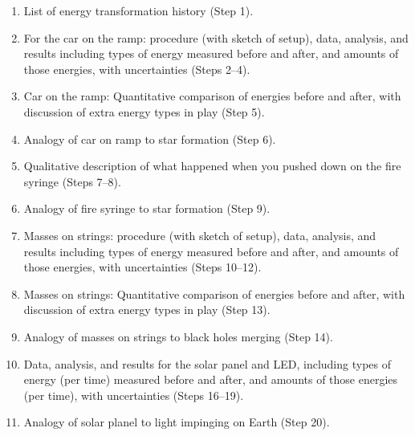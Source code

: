 \begin{enumerate}
	\item List of energy transformation history (Step 1).
	
	\item For the car on the ramp: procedure (with sketch of setup), data, analysis, and results including types of energy measured before and after, and amounts of those energies, with uncertainties (Steps 2--4).
	
	\item Car on the ramp: Quantitative comparison of energies before and after, with discussion of extra energy types in play (Step 5).
	
	\item Analogy of car on ramp to star formation (Step 6).
	
	\item Qualitative description of what happened when you pushed down on the fire syringe (Steps 7--8).
	
	\item Analogy of fire syringe to star formation (Step 9).
	
	\item Masses on strings: procedure (with sketch of setup), data, analysis, and results including types of energy measured before and after, and amounts of those energies, with uncertainties (Steps 10--12).
	
	\item Masses on strings: Quantitative comparison of energies before and after, with discussion of extra energy types in play (Step 13).
	
	\item Analogy of masses on strings to black holes merging (Step 14).
	
	\item Data, analysis, and results for the solar panel and LED, including types of energy (per time) measured before and after, and amounts of those energies (per time), with uncertainties (Steps 16--19).
	
	\item Analogy of solar planel to light impinging on Earth (Step 20).
\end{enumerate}